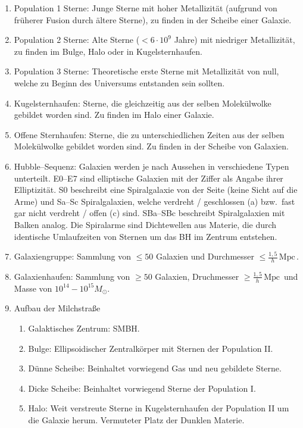 \documentclass[a4paper,12pt]{article}
\numberwithin{equation}{section}
\begin{document}
\begin{enumerate}[label=$\circ$]
        \item Population 1 Sterne: Junge Sterne mit hoher Metallizität (aufgrund von früherer Fusion durch ältere Sterne), zu finden in der Scheibe einer Galaxie.
        \item Population 2 Sterne: Alte Sterne ($<6\cdot 10^9$ Jahre) mit niedriger Metallizität, zu finden im Bulge, Halo oder in Kugelsternhaufen.
        \item Population 3 Sterne: Theoretische erste Sterne mit Metallizität von null, welche zu Beginn des Universums entstanden sein sollten.
        \item Kugelsternhaufen: Sterne, die gleichzeitig aus der selben Molekülwolke gebildet worden sind. Zu finden im Halo einer Galaxie.
        \item Offene Sternhaufen: Sterne, die zu unterschiedlichen Zeiten aus der selben Molekülwolke gebildet worden sind. Zu finden in der Scheibe von Galaxien.
        \item Hubble--Sequenz: Galaxien werden je nach Aussehen in verschiedene Typen unterteilt. E0--E7 sind elliptische Galaxien mit der Ziffer als Angabe ihrer Elliptizität. S0 beschreibt eine Spiralgalaxie von der Seite (keine Sicht auf die Arme) und Sa--Sc Spiralgalaxien, welche verdreht / geschlossen (a) bzw.\ fast gar nicht verdreht / offen (c) sind. SBa--SBc beschreibt Spiralgalaxien mit Balken analog. Die Spiralarme sind Dichtewellen aus Materie, die durch identische Umlaufzeiten von Sternen um das BH im Zentrum entstehen.
        \item Galaxiengruppe: Sammlung von $\leq 50$ Galaxien und Durchmesser $\leq \tfrac{1,5}{h}\,\text{Mpc}\,$.
        \item Galaxienhaufen: Sammlung von $\geq 50$ Galaxien, Druchmesser $\geq \tfrac{1,5}{h}\,\text{Mpc}\,$ und Masse von $10^{14}-10^{15}M_\odot$.
        \item Aufbau der Milchstraße
                \begin{enumerate}[label=]
                        \item Galaktisches Zentrum: SMBH.
                        \item Bulge: Ellipsoidischer Zentralkörper mit Sternen der Population II.
                        \item Dünne Scheibe: Beinhaltet vorwiegend Gas und neu gebildete Sterne.
                        \item Dicke Scheibe: Beinhaltet vorwiegend Sterne der Population I.
                        \item Halo: Weit verstreute Sterne in Kugelsternhaufen der Population II um die Galaxie herum. Vermuteter Platz der Dunklen Materie.

\end{enumerate}
\end{enumerate}
\end{document}
